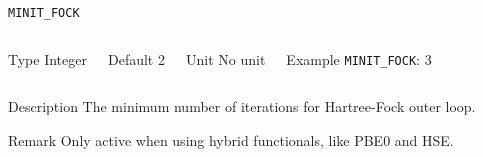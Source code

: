 \documentclass[xcolor=dvipsnames,t]{beamer}
\begin{document}
\begin{frame}[allowframebreaks]{\texttt{MINIT\_FOCK}} \label{MINIT_FOCK}
\vspace*{-12pt}
\begin{columns}
\begin{block}{Type}
Integer
\end{block}

\begin{block}{Default}
2
\end{block}

\begin{block}{Unit}
No unit
\end{block}

\begin{block}{Example}
\texttt{MINIT\_FOCK}: 3
\end{block}
\end{columns}

\begin{block}{Description}
The minimum number of iterations for Hartree-Fock outer loop.
\end{block}

\begin{block}{Remark}
Only active when using hybrid functionals, like PBE0 and HSE. 
\end{block}

\end{frame}
\end{document}
